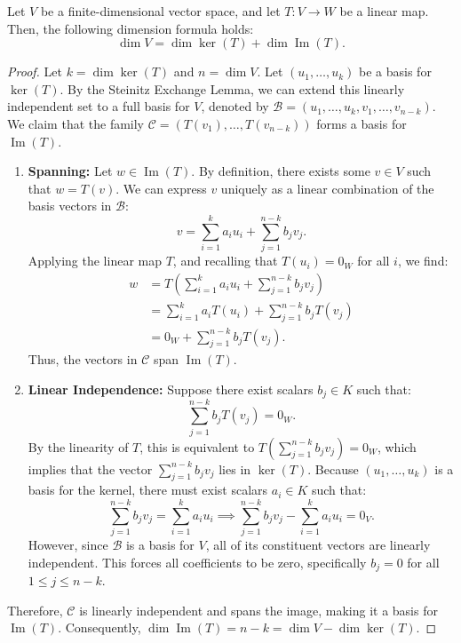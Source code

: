 \begin{theorem}
\label{thm:rank_nullity}
Let $V$ be a finite-dimensional vector space, and let $T: V \to W$ be a linear map. Then, the following dimension formula holds:
\[
\dim V = \dim \ker(T) + \dim \operatorname{Im}(T).
\]
\end{theorem}

\begin{proof}
Let $k = \dim \ker(T)$ and $n = \dim V$. Let $(u_1, \dots, u_k)$ be a basis for $\ker(T)$. By the Steinitz Exchange Lemma, we can extend this linearly independent set to a full basis for $V$, denoted by $\mathcal{B} = (u_1, \dots, u_k, v_1, \dots, v_{n-k})$. We claim that the family $\mathcal{C} = (T(v_1), \dots, T(v_{n-k}))$ forms a basis for $\operatorname{Im}(T)$.

\begin{enumerate}
    \item \textbf{Spanning:} Let $w \in \operatorname{Im}(T)$. By definition, there exists some $v \in V$ such that $w = T(v)$. We can express $v$ uniquely as a linear combination of the basis vectors in $\mathcal{B}$:
    \[
    v = \sum_{i=1}^k a_i u_i + \sum_{j=1}^{n-k} b_j v_j.
    \]
    Applying the linear map $T$, and recalling that $T(u_i) = 0_W$ for all $i$, we find:
    \begin{align*}
    w &= T\left( \sum_{i=1}^k a_i u_i + \sum_{j=1}^{n-k} b_j v_j \right) \\
    &= \sum_{i=1}^k a_i T(u_i) + \sum_{j=1}^{n-k} b_j T(v_j) \\
    &= 0_W + \sum_{j=1}^{n-k} b_j T(v_j).
    \end{align*}
    Thus, the vectors in $\mathcal{C}$ span $\operatorname{Im}(T)$.
    
    \item \textbf{Linear Independence:} Suppose there exist scalars $b_j \in K$ such that:
    \[
    \sum_{j=1}^{n-k} b_j T(v_j) = 0_W.
    \]
    By the linearity of $T$, this is equivalent to $T\left( \sum_{j=1}^{n-k} b_j v_j \right) = 0_W$, which implies that the vector $\sum_{j=1}^{n-k} b_j v_j$ lies in $\ker(T)$. Because $(u_1, \dots, u_k)$ is a basis for the kernel, there must exist scalars $a_i \in K$ such that:
    \[
    \sum_{j=1}^{n-k} b_j v_j = \sum_{i=1}^k a_i u_i \implies \sum_{j=1}^{n-k} b_j v_j - \sum_{i=1}^k a_i u_i = 0_V.
    \]
    However, since $\mathcal{B}$ is a basis for $V$, all of its constituent vectors are linearly independent. This forces all coefficients to be zero, specifically $b_j = 0$ for all $1 \le j \le n-k$. 
\end{enumerate}

Therefore, $\mathcal{C}$ is linearly independent and spans the image, making it a basis for $\operatorname{Im}(T)$. Consequently, $\dim \operatorname{Im}(T) = n - k = \dim V - \dim \ker(T)$.
\end{proof}


